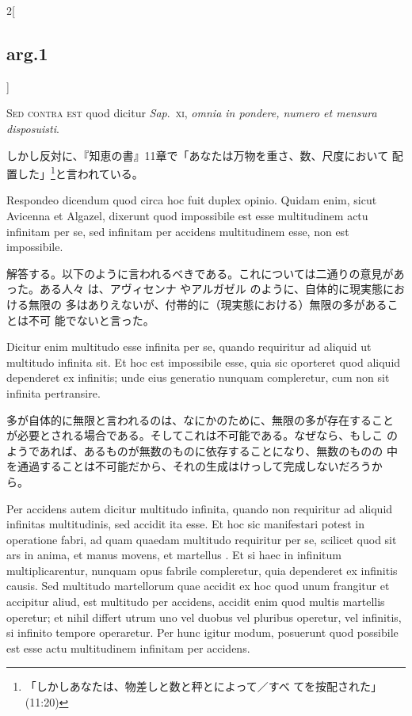 \documentclass[paper=a4paper,fontsize=10pt,jafontsize=9pt,titlepage]{jlreq}
\begin{document}
\begin{paracol}{2}[\subsection{arg.1}]
\switchcolumn*[\subsection{s.c.}]

{\scshape Sed contra est} quod dicitur {\itshape Sap}.~{\scshape xi}, {\itshape omnia in pondere, numero et mensura
 disposuisti}.

\switchcolumn

しかし反対に、『知恵の書』11章で「あなたは万物を重さ、数、尺度において
 配置した」\footnote{「しかしあなたは、物差しと数と秤とによって／すべ
 てを按配された」(11:20)}と言われている。

\switchcolumn*

Respondeo dicendum quod circa hoc fuit duplex opinio. Quidam enim, sicut
 Avicenna et Algazel, dixerunt quod impossibile est esse multitudinem
 actu infinitam per se, sed infinitam per accidens multitudinem esse,
 non est impossibile.

\switchcolumn

解答する。以下のように言われるべきである。これについては二通りの意見があった。ある人々
 は、アヴィセンナ やアルガゼル のように、自体的に現実態における無限の
 多はありえないが、付帯的に（現実態における）無限の多があることは不可
 能でないと言った。

\switchcolumn*

Dicitur enim multitudo esse infinita per se, quando requiritur ad
 aliquid ut multitudo infinita sit. Et hoc est impossibile esse, quia
 sic oporteret quod aliquid dependeret ex infinitis; unde eius generatio
 nunquam compleretur, cum non sit infinita pertransire.

\switchcolumn

多が自体的に無限と言われるのは、なにかのために、無限の多が存在すること
 が必要とされる場合である。そしてこれは不可能である。なぜなら、もしこ
 のようであれば、あるものが無数のものに依存することになり、無数のものの
 中を通過することは不可能だから、それの生成はけっして完成しないだろうか
 ら。

\switchcolumn*

Per accidens autem dicitur multitudo infinita, quando non requiritur ad
 aliquid infinitas multitudinis, sed accidit ita esse. Et hoc sic
 manifestari potest in operatione fabri, ad quam quaedam multitudo
 requiritur per se, scilicet quod sit ars in anima, et manus movens, et
 martellus . Et si haec in infinitum multiplicarentur, nunquam opus
 fabrile compleretur, quia dependeret ex infinitis causis. Sed multitudo
 martellorum quae accidit ex hoc quod unum frangitur et accipitur aliud,
 est multitudo per accidens, accidit enim quod multis martellis
 operetur; et nihil differt utrum uno vel duobus vel pluribus operetur,
 vel infinitis, si infinito tempore operaretur. Per hunc igitur modum,
 posuerunt quod possibile est esse actu multitudinem infinitam per
 accidens.


\end{paracol}
\end{document}
